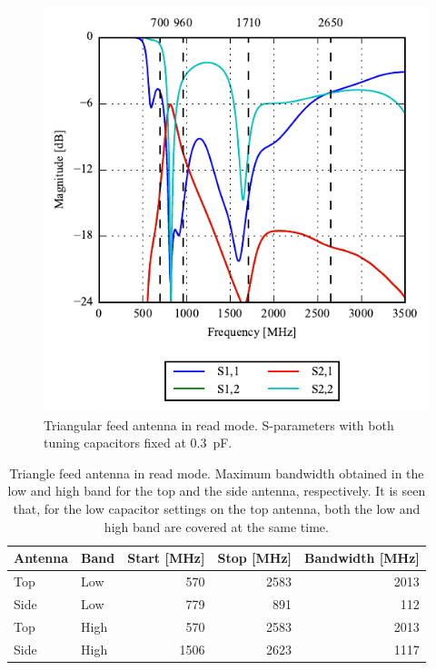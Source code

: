 
\begin{figure}[htbp]
    \centering
    \includegraphics{img/tech_sol/trianglefeed/read_mode/sparams.pdf}
    \caption{Triangular feed antenna in read mode. S-parameters with both tuning capacitors fixed at \SI{0.3}{pF}.}
    \label{fig:triang_sparam_read}
\end{figure}

\begin{table}[htbp]
    \centering
    \begin{tabular}{|l|l|r|r|r|}
        \hline
        Antenna & Band & Start [MHz] & Stop [MHz] & Bandwidth [MHz] \\
        \hline
        Top     & Low  & 570         & 2583       & 2013 \\
        Side    & Low  & 779         & 891        & 112  \\
        \hline
        Top     & High & 570         & 2583       & 2013 \\
        Side    & High & 1506        & 2623       & 1117 \\
        \hline
    \end{tabular}
    \caption{Triangle feed antenna in read mode. Maximum bandwidth obtained in the low and high band for the top and the side antenna, respectively. It is seen that, for the low capacitor settings on the top antenna, both the low and high band are covered at the same time.}
    \label{tab:bw_sol2read}
\end{table}

